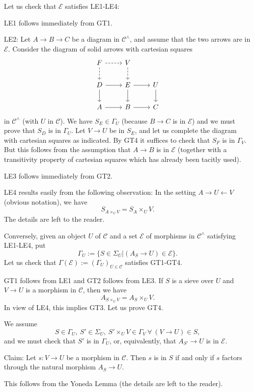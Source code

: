 \documentclass[12pt]{article}%
\theoremstyle{remark}
\theoremstyle{definition}
\newcommand{\nn}{\noindent}
\newcommand{\cc}{\mathcal}
\newcommand{\C}{\mathcal C}
\begin{document}
Let us check that $\cc E$ satisfies LE1-LE4:

\nn LE1 follows immediately from GT1.

\nn LE2: Let $A\to B\to C$ be a diagram in $\C^\wedge$, and assume that the two arrows are in $\cc E$. Consider the diagram of solid arrows with cartesian squares 
$$
\begin{tikzcd}
F\ar[dashed]{r}\ar[dashed]{d}&V\ar[dashed]{d}\\ 
D\ar{r}\ar{d}&E\ar{r}\ar{d}&U\ar{d}\\ 
A\ar{r}&B\ar{r}&C
\end{tikzcd}
$$
in $\C^\wedge$ (with $U$ in $\C$). We have $S_E\in\Gamma_U$ (because $B\to C$ is in $\cc E$) and we must prove that $S_D$ is in $\Gamma_U$. Let $V\to U$ be in $S_E$, and let us complete the diagram with cartesian squares as indicated. By GT4 it suffices to check that $S_F$ is in $\Gamma_V$. But this follows from the assumption that $A\to B$ is in $\cc E$ (together with a transitivity property of cartesian squares which has already been tacitly used).

\nn LE3 follows immediately from GT2.

\nn LE4 results easily from the following observation: In the setting $A\to U\leftarrow V$ (obvious notation), we have 
$$
S_{A\times_UV}=S_A\times_UV.
$$
The details are left to the reader.

Conversely, given an object $U$ of $\C$ and a set $\cc E$ of morphisms in $\C^\wedge$ satisfying LE1-LE4, put
$$
\Gamma_U:=\{S\in\Sigma_U|(A_S\to U)\in\cc E\}.
$$
Let us check that $\Gamma(\cc E):=(\Gamma_U)_{U\in\C}$ satisfies GT1-GT4.

GT1 follows from LE1 and GT2 follows from LE3. If $S$ is a sieve over $U$ and $V\to U$ is a morphism in $\C$, then we have 
%
\begin{equation}\label{asuv}
A_{S\times_UV}=A_S\times_UV.
\end{equation}
%
In view of LE4, this implies GT3. Let us prove GT4. 

We assume 
$$
S\in\Gamma_U,\ S'\in\Sigma_U,\ S'\times_UV\in\Gamma_V\ \forall\ (V\to U)\in S,
$$ 
and we must check that $S'$ is in $\Gamma_U$, or, equivalently, that $A_{S'}\to U$ is in $\cc E$. 

Claim: Let $s:V\to U$ be a morphism in $\C$. Then $s$ is in $S$ if and only if $s$ factors through the natural morphism $A_S\to U$.

This follows from the Yoneda Lemma (the details are left to the reader). 
\end{document}
